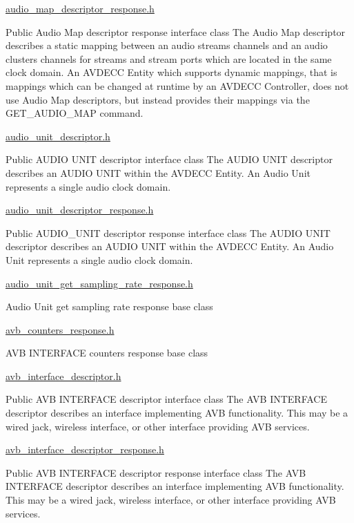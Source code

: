 \hyperlink{audio__map__descriptor__response_8h}{audio\+\_\+map\+\_\+descriptor\+\_\+response.\+h}

Public Audio Map descriptor response interface class The Audio Map descriptor describes a static mapping between an audio stream\textquotesingle{}s channels and an audio cluster\textquotesingle{}s channels for streams and stream ports which are located in the same clock domain. An A\+V\+D\+E\+CC Entity which supports dynamic mappings, that is mappings which can be changed at runtime by an A\+V\+D\+E\+CC Controller, does not use Audio Map descriptors, but instead provides their mappings via the G\+E\+T\+\_\+\+A\+U\+D\+I\+O\+\_\+\+M\+AP command.

\hyperlink{audio__unit__descriptor_8h}{audio\+\_\+unit\+\_\+descriptor.\+h}

Public A\+U\+D\+IO U\+N\+IT descriptor interface class The A\+U\+D\+IO U\+N\+IT descriptor describes an A\+U\+D\+IO U\+N\+IT within the A\+V\+D\+E\+CC Entity. An Audio Unit represents a single audio clock domain.

\hyperlink{audio__unit__descriptor__response_8h}{audio\+\_\+unit\+\_\+descriptor\+\_\+response.\+h}

Public A\+U\+D\+I\+O\+\_\+\+U\+N\+IT descriptor response interface class The A\+U\+D\+IO U\+N\+IT descriptor describes an A\+U\+D\+IO U\+N\+IT within the A\+V\+D\+E\+CC Entity. An Audio Unit represents a single audio clock domain.

\hyperlink{audio__unit__get__sampling__rate__response_8h}{audio\+\_\+unit\+\_\+get\+\_\+sampling\+\_\+rate\+\_\+response.\+h}

Audio Unit get sampling rate response base class

\hyperlink{avb__counters__response_8h}{avb\+\_\+counters\+\_\+response.\+h}

A\+VB I\+N\+T\+E\+R\+F\+A\+CE counters response base class

\hyperlink{avb__interface__descriptor_8h}{avb\+\_\+interface\+\_\+descriptor.\+h}

Public A\+VB I\+N\+T\+E\+R\+F\+A\+CE descriptor interface class The A\+VB I\+N\+T\+E\+R\+F\+A\+CE descriptor describes an interface implementing A\+VB functionality. This may be a wired jack, wireless interface, or other interface providing A\+VB services.

\hyperlink{avb__interface__descriptor__response_8h}{avb\+\_\+interface\+\_\+descriptor\+\_\+response.\+h}

Public A\+VB I\+N\+T\+E\+R\+F\+A\+CE descriptor response interface class The A\+VB I\+N\+T\+E\+R\+F\+A\+CE descriptor describes an interface implementing A\+VB functionality. This may be a wired jack, wireless interface, or other interface providing A\+VB services.

